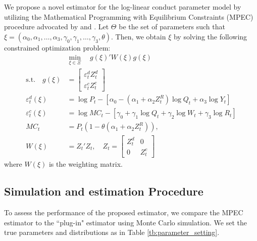 \documentclass[11pt, a4paper]{article}
\begin{document}
We propose a novel estimator for the log-linear conduct parameter model by utilizing the Mathematical Programming with Equilibrium Constraints (MPEC) procedure advocated by \cite{su2012constrained} and \cite{dube2012improving}. Let $\Theta$ be the set of parameters such that $\xi = (\alpha_0,\alpha_1, \ldots, \alpha_3, \gamma_0,\gamma_1, \ldots, \gamma_3, \theta)$. Then, we obtain $\xi$ by solving the following constrained optimization problem:
\begin{align}
    &\min_{\xi \in \Xi}\quad g(\xi)' W(\xi) g(\xi) \\
    \text{s.t.}\quad g(\xi)&=\left[\begin{array}{l}
\varepsilon^{d}_{t}Z_{t}^{d} \\
\varepsilon^{c}_{t}Z_{t}^{c}
\end{array}\right]\\
    \varepsilon^{d}_{t}(\xi)&=\log P_{t} -[\alpha_0 - (\alpha_1 + \alpha_2 Z^{R}_{t}) \log Q_t + \alpha_3 \log Y_t] \\
    \varepsilon^{c}_{t} (\xi)&= \log MC_t -[\gamma_0 + \gamma_1 \log Q_t +  \gamma_2 \log W_{t} + \gamma_3 \log R_t]\\
    MC_t &= P_t(1 - \theta (\alpha_1 + \alpha_2 Z^{R}_{t})),\\
    W(\xi)&=Z_{t}'Z_{t}, \quad Z_{t}=\left[\begin{array}{ll}
Z_{t}^{d} & 0 \\
0 & Z_{t}^{c}
\end{array}\right]
\end{align}
where $W(\xi)$ is the weighting matrix. 



\subsection{Simulation and estimation Procedure}

To assess the performance of the proposed estimator, we
compare the MPEC estimator to the ``plug-in" estimator using
Monte Carlo simulation.
We set the true parameters and distributions as in Table \ref{tb:parameter_setting}. 
\end{document}
